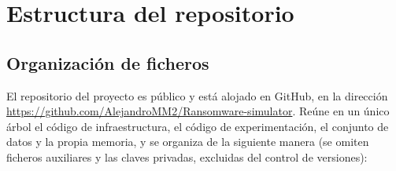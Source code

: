 \documentclass[../main.tex]{subfiles}
\begin{document}
\chapter{Estructura del repositorio}
\label{anx:repositorio}

\section{Organización de ficheros}

El repositorio del proyecto es público y está alojado en GitHub, en la
dirección \url{https://github.com/AlejandroMM2/Ransomware-simulator}. Reúne
en un único árbol el código de infraestructura, el código de experimentación,
el conjunto de datos y la propia memoria, y se organiza de la siguiente manera
(se omiten ficheros auxiliares y las claves privadas, excluidas del control de
versiones):
\end{document}
